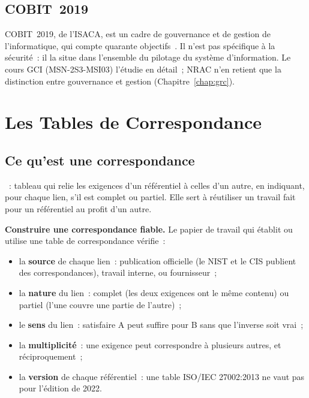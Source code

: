 \subsection{COBIT~2019}

COBIT~2019, de l'ISACA, est un cadre de gouvernance et de gestion de
l'informatique, qui compte quarante objectifs~\cite{isaca2018cobitintro}.
Il n'est pas spécifique à la sécurité~: il la situe dans l'ensemble du
pilotage du système d'information. Le cours GCI (MSN-2S3-MSI03) l'étudie en
détail~; NRAC n'en retient que la distinction entre gouvernance et gestion
(Chapitre~\ref{chap:grc}).

\section{Les Tables de Correspondance}
\label{sec:c09-correspondances}

\subsection{Ce qu'est une correspondance}

\begin{boxdef}
~:
tableau qui relie les exigences d'un référentiel à celles d'un autre, en
indiquant, pour chaque lien, s'il est complet ou partiel. Elle sert à
réutiliser un travail fait pour un référentiel au profit d'un autre.
\end{boxdef}

\begin{boxprocedure}
\textbf{Construire une correspondance fiable.} Le papier de travail qui
établit ou utilise une table de correspondance vérifie~:
\begin{itemize}
    \item la \textbf{source} de chaque lien~: publication officielle (le
          NIST et le CIS publient des correspondances), travail interne,
          ou fournisseur~;
    \item la \textbf{nature} du lien~: complet (les deux exigences ont le
          même contenu) ou partiel (l'une couvre une partie de l'autre)~;
    \item le \textbf{sens} du lien~: satisfaire A peut suffire pour B sans
          que l'inverse soit vrai~;
    \item la \textbf{multiplicité}~: une exigence peut correspondre à
          plusieurs autres, et réciproquement~;
    \item la \textbf{version} de chaque référentiel~: une table ISO/IEC
          27002:2013 ne vaut pas pour l'édition de 2022.
\end{itemize}
\end{boxprocedure}


